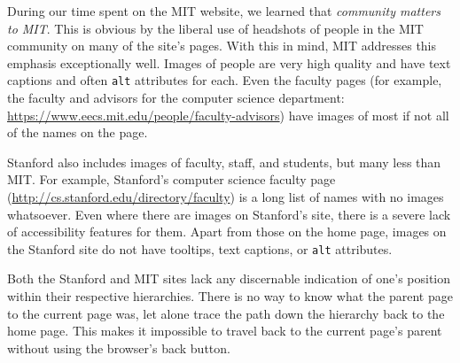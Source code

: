 During our time spent on the MIT website, we learned that \textit{community
matters to MIT}. This is obvious by the liberal use of headshots of people in
the MIT community on many of the site's pages. With this in mind, MIT addresses
this emphasis exceptionally well. Images of people are very high quality and
have text captions and often \texttt{alt} attributes for each. Even the faculty
pages (for example, the faculty and advisors for the computer science department:
\url{https://www.eecs.mit.edu/people/faculty-advisors}) have images of most if
not all of the names on the page.

Stanford also includes images of faculty, staff, and students, but many less
than MIT. For example, Stanford's computer science faculty page
(\url{http://cs.stanford.edu/directory/faculty}) is a long list of names
with no images whatsoever. Even where there are images on Stanford's site,
there is a severe lack of accessibility features for them. Apart from those
on the home page, images on the Stanford site do not have tooltips, text
captions, or \texttt{alt} attributes.

Both the Stanford and MIT sites lack any discernable indication of one's position within their respective hierarchies.
There is no way to know what the parent page to the current page was, let alone trace the path down the hierarchy back to
the home page. This makes it impossible to travel back to the current page's parent without using the browser's back
button.